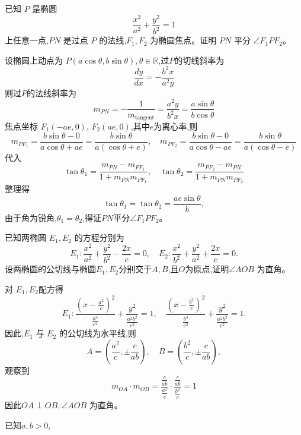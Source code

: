 \begin{questions}
    \question 已知 $P$ 是椭圆 
    \[
    \frac{x^2}{a^2}+\frac{y^2}{b^2}=1
    \]
    上任意一点,$PN$ 是过点 $P$ 的法线,$F_1, F_2$ 为椭圆焦点。证明 $PN$ 平分 $\angle F_1PF_2$。
    \begin{solution}
        设椭圆上动点为 $P(a\cos\theta, b\sin\theta),\theta \in \mathbb{R}$,过$P$的切线斜率为
        \[
        \frac{dy}{dx} = -\frac{b^2 x}{a^2 y}
        \]
        则过$P$的法线斜率为
        \[
        m_{PN} = -\frac{1}{m_\text{tangent}} = \frac{a^2 y}{b^2 x} = \frac{a\sin\theta}{b\cos\theta}
        \]
        焦点坐标 $F_1(-ae,0)$, $F_2(ae,0)$,其中$e$为离心率,则
        \[
        m_{PF_1} = \frac{b\sin\theta - 0}{a\cos\theta + ae} = \frac{b\sin\theta}{a(\cos\theta + e)},\quad
        m_{PF_2} = \frac{b\sin\theta - 0}{a\cos\theta - ae} = \frac{b\sin\theta}{a(\cos\theta - e)}
        \]
        代入
        \[
        \tan\theta_1 = \frac{m_{PN} - m_{PF_1}}{1 + m_{PN} m_{PF_1}},\quad
        \tan\theta_2 = \frac{m_{PF_2} - m_{PN}}{1 + m_{PN} m_{PF_2}}
        \]
        整理得
        \[
        \tan\theta_1 = \tan\theta_2= \frac{ae\sin\theta}{b},
        \]
        由于角为锐角,$\theta_1 = \theta_2$,得证$PN$平分$\angle F_1PF_2$。
    \end{solution}

    \question 已知两椭圆 $E_1,E_2$ 的方程分别为  
    \[
    E_1: \frac{x^2}{a^2} + \frac{y^2}{b^2} - \frac{2x}{c} = 0, \quad
    E_2: \frac{x^2}{b^2} + \frac{y^2}{a^2} + \frac{2x}{c} = 0.
    \]  
    设两椭圆的公切线与椭圆$E_1,E_2$分别交于$A,B$,且$O$为原点,证明$\angle AOB$ 为直角。
    \begin{solution}
        对 $E_1,E_2$配方得
        \[
        E_1:\frac{\left(x - \frac{a^2}{c}\right)^2}{\frac{a^4}{c^2}} + \frac{y^2}{\frac{a^2 b^2}{c^2}} = 1, \quad \frac{\left(x - \frac{b^2}{c}\right)^2}{\frac{b^4}{c^2}} + \frac{y^2}{\frac{a^2 b^2}{c^2}} = 1.
        \]
        因此,$E_1$ 与 $E_2$ 的公切线为水平线,则
        \[
        A = \left(\frac{a^2}{c}, \pm \frac{c}{ab}\right), \quad B = \left(\frac{b^2}{c}, \pm \frac{c}{ab}\right),
        \]
        观察到
        \[
        m_{OA}\cdot m_{OB}  = \frac{\frac{c}{ab}}{\frac{a^2}{c}} \cdot \frac{\frac{c}{ab}}{\frac{b^2}{c}} = 1
        \]
        因此$OA \perp OB,\angle AOB$ 为直角。
    \end{solution}

    \question 已知$a,b>0$,
    \begin{parts}

\end{parts}
\end{questions}

